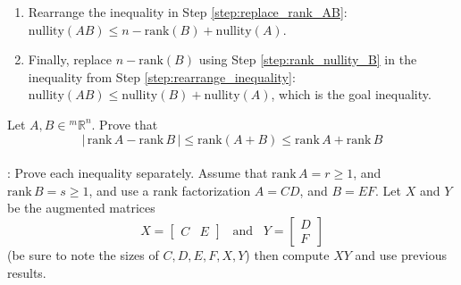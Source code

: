\documentclass[10pt]{article}
\newcommand{\noin}{\noindent}
\begin{document}
{{\begin{enumerate}
		\item Rearrange the inequality in Step \ref{step:replace_rank_AB}: \\
			  \( \text{nullity}(AB) \leq n - \text{rank}(B) + \text{nullity}(A) \). \label{step:rearrange_inequality}
		
		\item Finally, replace \( n - \text{rank}(B) \) using Step \ref{step:rank_nullity_B} in the inequality from Step \ref{step:rearrange_inequality}: \\
			  \( \text{nullity}(AB) \leq \text{nullity}(B) + \text{nullity}(A) \), which is the goal inequality. \label{step:final_step}
	\end{enumerate}
	
	
	}
}


\pagebreak


\noin{\bf 3.}   Let $A, B\in {^m}\mathbb R^n$. Prove that
$$|\, \mathrm{rank}\, A -\mathrm{rank}\, B\,| \leq \mathrm{rank}(A+B) \leq \mathrm{rank}\, A +\mathrm{rank}\, B$$\\

\noin{\it Hint}:  Prove each inequality separately.  Assume that $\mathrm{rank}\, A=r\ge 1$, and $\mathrm{rank}\, B=s\ge 1$, and use a rank factorization $A=CD$, and $B=EF$.  Let $X$ and $Y$ be the augmented matrices 
$$X=\begin{bmatrix} C & E \end{bmatrix} \,\,\, \mbox{ and } \,\,\, Y=\begin{bmatrix} D\\ F\end{bmatrix}$$
(be sure to note the sizes of $C, D, E, F, X, Y$) then compute $XY$ and use previous results.
\end{document}
